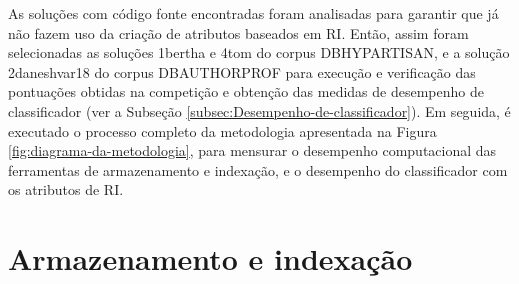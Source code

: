     

    As soluções com código fonte encontradas foram analisadas para garantir que já não fazem uso da criação de atributos baseados em RI.
    Então, assim foram selecionadas as soluções 1\underscore{}bertha e 4\underscore{}tom do corpus DB\underscore{}HYPARTISAN, e a solução 2\underscore{}daneshvar18 do corpus DB\underscore{}AUTHORPROF para execução e verificação das pontuações obtidas na competição e obtenção das medidas de desempenho de classificador (ver a Subseção \ref{subsec:Desempenho-de-classificador}).
    Em seguida, é executado o processo completo da metodologia apresentada na Figura \ref{fig:diagrama-da-metodologia}, para mensurar o desempenho computacional das ferramentas de armazenamento e indexação, e o desempenho do classificador com os atributos de RI.
    
    
\section{Armazenamento e indexação} \label{sec:Armazenamento-e-indexação}

